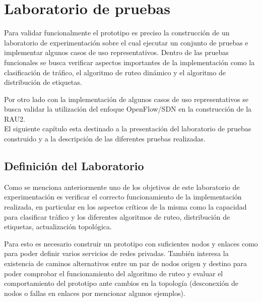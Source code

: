 \chapter{Laboratorio de pruebas}
\label{chapter6}

\ifpdf
    \graphicspath{{Chapter6/Figs/Raster/}{Chapter6/Figs/PDF/}{Chapter6/Figs/}}
\else
    \graphicspath{{Chapter6/Figs/Vector/}{Chapter6/Figs/}}
\fi

Para validar funcionalmente el prototipo es preciso la construcción de un laboratorio de experimentación sobre el cual ejecutar un conjunto de pruebas e implementar algunos casos de uso representativos. Dentro de las pruebas funcionales se busca verificar aspectos importantes de la implementaci\'on como la clasificación de tr\'afico, el algoritmo de ruteo dinámico y el algoritmo de distribución de etiquetas.

Por otro lado con la implementaci\'on de algunos casos de uso representativos se busca validar la utilización del enfoque OpenFlow/SDN en la construcci\'on de la RAU2.\\

El siguiente cap\'itulo esta destinado a la presentación del laboratorio de pruebas construido y a la descripción de las diferentes pruebas realizadas.

\section{Definición del Laboratorio}

Como se menciona anteriormente uno de los objetivos de este laboratorio de experimentaci\'on es verificar el correcto funcionamiento de la implementaci\'on realizada, en particular en los aspectos críticos de la misma como la capacidad para clasificar tr\'afico y los diferentes algoritmos de ruteo, distribución de etiquetas, actualización topol\'ogica. 

Para esto es necesario construir un prototipo con suficientes nodos y enlaces como para poder definir varios servicios de redes privadas. Tambi\'en interesa la existencia de caminos alternativos entre un par de nodos origen y destino para poder comprobar el funcionamiento del algoritmo de ruteo y evaluar el comportamiento del prototipo ante cambios en la topolog\'ia (desconexi\'on de nodos o fallas en enlaces por mencionar algunos ejemplos).

